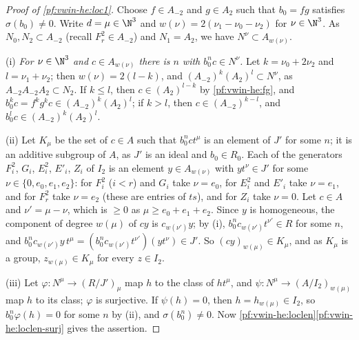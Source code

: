 \begin{proof}[Proof of \cref{pf:vwin-he:loc1}]
Choose $f\in A_{-2}$ and $g\in A_2$ such that $b_0=fg$ satisfies $\sigma(b_0)\ne0$. Write $d=\mu\in\N^3$ and
$w(\nu)=2(\nu_1-\nu_0-\nu_2)$ for $\nu\in\N^3$. As $N_0,N_2\subset A_{-2}$ (recall $F_r^2\in A_{-2}$) and $N_1=A_2$, we
have $N^\nu\subset A_{w(\nu)}$.

(i) \emph{For $\nu\in\N^3$ and $c\in A_{w(\nu)}$ there is $n$ with $b_0^nc\in N^\nu$.} Let $k=\nu_0+2\nu_2$ and
$l=\nu_1+\nu_2$; then $w(\nu)=2(l-k)$, and $(A_{-2})^k(A_2)^l\subset N^\nu$, as $A_{-2}A_{-2}A_2\subset N_2$. If
$k\le l$, then $c\in(A_2)^{l-k}$ by \cref{pf:vwin-he:fg}, and $b_0^kc=f^kg^kc\in(A_{-2})^k(A_2)^l$; if $k>l$, then
$c\in(A_{-2})^{k-l}$, and $b_0^lc\in(A_{-2})^k(A_2)^l$.

(ii) Let $K_\mu$ be the set of $c\in A$ such that $b_0^nct^\mu$ is an element of $J'$ for some $n$; it is an additive
subgroup of $A$, as $J'$ is an ideal and $b_0\in R_0$. Each of the generators $F_i^2$, $G_i$, $E_i^2$, $E'_i$, $Z_i$ of
$I_2$ is an element $y\in A_{w(\nu)}$ with $yt^\nu\in J'$ for some $\nu\in\{0,e_0,e_1,e_2\}$: for $F_i^2$ ($i<r$) and
$G_i$ take $\nu=e_0$, for $E_i^2$ and $E'_i$ take $\nu=e_1$, and for $F_r^2$ take $\nu=e_2$ (these are entries of $ts$),
and for $Z_i$ take $\nu=0$. Let $c\in A$ and $\nu'=\mu-\nu$, which is $\ge0$ as $\mu\ge e_0+e_1+e_2$. Since $y$ is
homogeneous, the component of degree $w(\mu)$ of $cy$ is $c_{w(\nu')}y$; by (i), $b_0^nc_{w(\nu')}t^{\nu'}\in R$ for
some $n$, and $b_0^nc_{w(\nu')}y\,t^\mu=(b_0^nc_{w(\nu')}t^{\nu'})(yt^\nu)\in J'$. So $(cy)_{w(\mu)}\in K_\mu$, and as
$K_\mu$ is a group, $z_{w(\mu)}\in K_\mu$ for every $z\in I_2$.

(iii) Let $\varphi:N^\mu\to(R/J')_\mu$ map $h$ to the class of $ht^\mu$, and $\psi:N^\mu\to(A/I_2)_{w(\mu)}$ map $h$
to its class; $\varphi$ is surjective. If $\psi(h)=0$, then $h=h_{w(\mu)}\in I_2$, so $b_0^n\varphi(h)=0$ for some $n$
by (ii), and $\sigma(b_0^n)\ne0$. Now \cref{pf:vwin-he:loclen}\ref{pf:vwin-he:loclen-surj} gives the assertion.
\end{proof}

